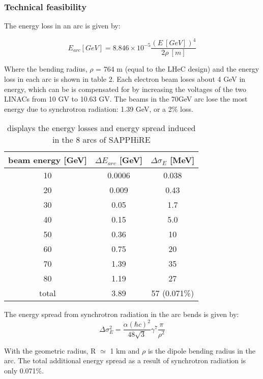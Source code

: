 \subsubsection{Technical feasibility}
The energy loss in an arc is given by:

\begin{equation}
E_{arc}[GeV]=8.846 \times 10^{-5}\frac{(E \ [GeV])^{4}}{2\rho \ [m]}
\end{equation}

Where the bending radius, $\rho$ = 764 m (equal to the LHeC design) and the energy loss in each arc is shown in table 2. Each electron beam loses about 4 GeV in energy, which can be is compensated for by increasing the voltages of the two LINACs from 10 GV to 10.63 GV. The beams in the 70GeV arc lose the most energy due to synchrotron radiation: 1.39 GeV, or a 2\% loss\cite{Bogacz:SAPPHiRE}.

\begin{table}
\begin{center}
\begin{tabular}{c c c}
\hline
\hline
beam energy [GeV] & $\Delta E_{arc}$ [GeV] & $\Delta\sigma_{E}$ [MeV]\\
\hline
10 & 0.0006 & 0.038\\
20 & 0.009 & 0.43\\
30 & 0.05 & 1.7\\
40 & 0.15 & 5.0\\
50 & 0.36 & 10\\
60 & 0.75 & 20\\
70 & 1.39 & 35\\
80 & 1.19 & 27\\
\hline
total & 3.89 & 57 (0.071\%)\\
\hline
\hline
\end{tabular}
\caption{displays the energy losses and energy spread induced in the 8 arcs of SAPPHiRE}
\end{center}
\end{table}

The energy spread from synchrotron radiation in the arc bends is given by:
\begin{equation}
\Delta\sigma^{2}_{E}=\frac{\alpha(\hbar c)^{2}}{48\sqrt{3}}\gamma^{7}\frac{\pi}{\rho^{2}}
\end{equation}

With the geometric radius, R $\simeq$ 1 km and $\rho$ is the dipole bending radius in the arc. The total additional energy spread as a result of synchrotron radiation is only 0.071\%\cite{Bogacz:SAPPHiRE}.

